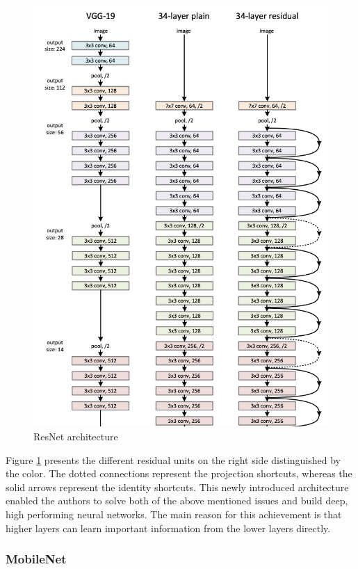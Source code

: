 \begin{figure}[ht]
  \centering
  \includegraphics[width=\linewidth]{figures/resnet.png}
  \caption{ResNet architecture}
  \label{fig:resnet}
\end{figure}

Figure \ref{fig:resnet} presents the different residual units on the right side distinguished by the color. The dotted connections represent the projection shortcuts, whereas the solid arrows represent the identity shortcuts.
This newly introduced architecture enabled the authors to solve both of the above mentioned issues and build deep, high performing neural networks. The main reason for this achievement is that higher layers can learn important information from the lower layers directly.

\subsubsection{MobileNet}\label{mobilenet}

